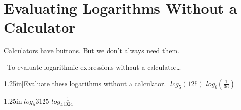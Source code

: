 \section{Evaluating Logarithms Without a Calculator}

Calculators have  buttons.
But we don't always need them.

\begin{myConceptSteps}{%
    ~To evaluate logarithmic expressions without a calculator\dots}
\end{myConceptSteps}

\begin{my2Problems}{1.25in}[Evaluate these logarithms without a calculator.]
    {$log_5(125)$}
    {$log_6(\frac{1}{36})$}
\end{my2Problems}
\begin{my2Problems}{1.25in}
    {$log_{5}3125$}
    {$log_4{\frac{1}{1024}}$}
\end{my2Problems}